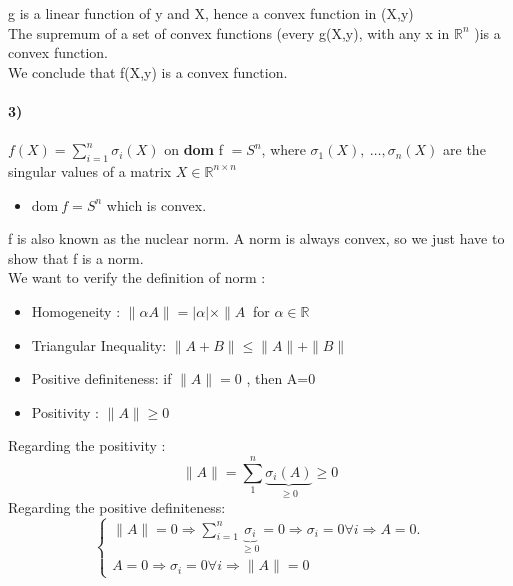 \documentclass[12pt,a4paper]{article}
\begin{document}
	g is a linear function of y and X, hence a convex function in (X,y)\\
The supremum of a set of convex functions (every g(X,y), with any x in $ \mathbb{R}^n $ )is a convex function.\\
We conclude that f(X,y) is a convex function.
\paragraph{3)} $ f(X)= \sum_{i=1}^{n}\sigma_i(X)$ on \textbf{dom} f $ = S^n $, where $ \sigma_1(X),~\dots,\sigma_n(X) $ are the singular values of a matrix $ X \in \mathbb{R}^{n \times n } $ 
\begin{itemize}
	\item $ \text{dom} ~f=S^n $ which is convex.
 \end{itemize}
f is also known as the nuclear norm. A norm is always convex, so we just have to show that f is a norm.\\
We want to verify the definition of norm : \\
\begin{itemize}
	\item Homogeneity : $\| \alpha A\| = |\alpha| \times \| A\ $
for $ \alpha \in \mathbb{R} $\\
\item Triangular Inequality: $ \| A+B\|\leq \|A\|+\|B\|$\\
\item Positive definiteness: if $\|A\|=0$ ,
 then A=0\\
\item Positivity : $ \|A\|\geq 0 $\\
\end{itemize}
Regarding the positivity :\\
\[
	\|A\|=\sum_1^n \underbrace{\sigma_i(A)}_{\geq 0} \geq 0
\]
Regarding the positive definiteness: 
$$
\begin{cases}
	\|A\|=0 \Rightarrow \sum_{i=1}^{n} \underbrace{\sigma_i}_{\geq 0} =0 \Rightarrow \sigma_i=0 \forall i \Rightarrow A=0.\\
A=0 \Rightarrow \sigma_i=0 \forall i \Rightarrow \|A\|=0	
\end{cases}
$$
\end{document}
